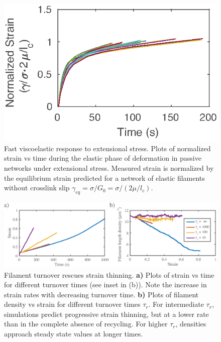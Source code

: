 \documentclass[10pt,letterpaper]{article}
\begin{document}
\begin{figure}[h!]
\centering
\includegraphics[width=\hsize]{figures/figureS2}
\caption{\label{fig:passive_supp}  Fast viscoelastic response to extensional stress. Plots of normalized strain vs time during the elastic phase of deformation in passive networks under extensional stress.  Measured strain is normalized by the equilibrium strain predicted for a network of elastic filaments without crosslink slip $\gamma_{eq} = \sigma/G_0 = \sigma/(2\mu/l_c)$.  }
\end{figure}

\begin{figure}[h!]
	\centering
	\includegraphics[width=\hsize]{figures/figureS3}
	\caption{\label{fig:thinning}  Filament turnover rescues strain thinning.  \textbf{a)} Plots of strain vs time for different turnover times (see inset in (b)). Note the increase in strain rates with decreasing turnover time. \textbf{b)} Plots of filament density vs strain for different turnover times $\tau_r$.  For intermediate $\tau_r$, simulations predict progressive strain thinning, but at a lower rate than in the complete absence of recycling. For higher $\tau_r$, densities approach steady state values at longer times.  }
\end{figure}
\end{document}

